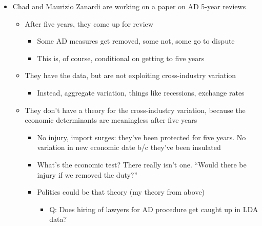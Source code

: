 \documentclass[12pt]{article}
\begin{document}
\newpage
\begin{itemize}
	\item Chad and Maurizio Zanardi are working on a paper on AD 5-year reviews
		\begin{itemize}
			\item After five years, they come up for review 
				\begin{itemize}
					\item Some AD measures get removed, some not, some go to dispute
					\item This is, of course, conditional on getting to five years
				\end{itemize}
			\item They have the data, but are not exploiting cross-industry variation
				\begin{itemize}
					\item Instead, aggregate variation, things like recessions, exchange rates
				\end{itemize}
			\item They don't have a theory for the cross-industry variation, because the economic determinants are meaningless after five years
				\begin{itemize}
					\item No injury, import surges: they've been protected for five years. No variation in new economic date b/c they've been insulated
					\item What's the economic test? There really isn't one. ``Would there be injury if we removed the duty?''
					\item Politics could be that theory (my theory from above)
						\begin{itemize}
							\item Q: Does hiring of lawyers for AD procedure get caught up in LDA data?
						\end{itemize}
				\end{itemize}
		\end{itemize}
\end{itemize}

		
\end{document}
